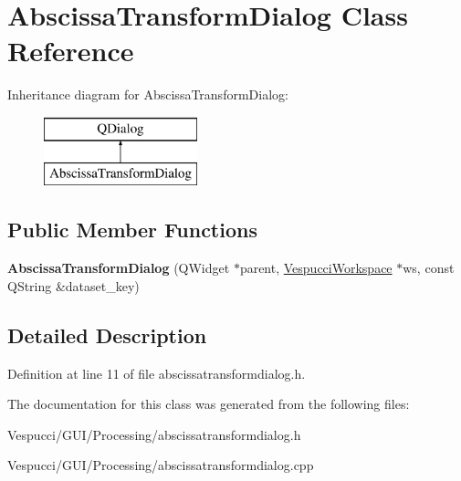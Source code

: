 \hypertarget{class_abscissa_transform_dialog}{}\section{Abscissa\+Transform\+Dialog Class Reference}
\label{class_abscissa_transform_dialog}
Inheritance diagram for Abscissa\+Transform\+Dialog\+:\begin{figure}[H]
\begin{center}
\leavevmode
\includegraphics[height=2.000000cm]{class_abscissa_transform_dialog}
\end{center}
\end{figure}
\subsection*{Public Member Functions}
\begin{DoxyCompactItemize}
\item 
{\bfseries Abscissa\+Transform\+Dialog} (Q\+Widget $\ast$parent, \hyperlink{class_vespucci_workspace}{Vespucci\+Workspace} $\ast$ws, const Q\+String \&dataset\+\_\+key)\hypertarget{class_abscissa_transform_dialog_a20def5fdff77bc501e1afb57bccbd3d5}{}\label{class_abscissa_transform_dialog_a20def5fdff77bc501e1afb57bccbd3d5}

\end{DoxyCompactItemize}


\subsection{Detailed Description}


Definition at line 11 of file abscissatransformdialog.\+h.



The documentation for this class was generated from the following files\+:\begin{DoxyCompactItemize}
\item 
Vespucci/\+G\+U\+I/\+Processing/abscissatransformdialog.\+h\item 
Vespucci/\+G\+U\+I/\+Processing/abscissatransformdialog.\+cpp\end{DoxyCompactItemize}
